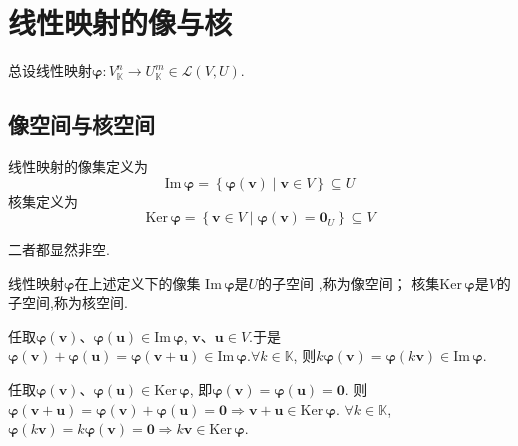 \section{线性映射的像与核}
\begin{red}
\begin{remark}
    总设线性映射$\bm{\varphi}:V_{\mathbb{K}}^n\longrightarrow U_{\mathbb{K}}^m \in 
\mathcal{L}\left(V,U\right)$.
\end{remark}
\end{red}
\subsection{像空间与核空间}
\begin{formal}
\begin{definition}[像集与核集]\label{def:像集与核集}
    线性映射的像集定义为
    \[
    \mathrm{Im}\, \bm{\varphi}=\left\{
        \bm{\varphi}\left(\bm{v}\right)\mid
        \bm{v} \in V
    \right\}\subseteq U
    \]
    核集定义为
    \[
    \mathrm{Ker}\,\bm{\varphi}=
    \left\{\bm{v}\in V \mid \bm{\varphi}\left(\bm{v}\right)=\bm{0}_{U}\right\}\subseteq V
    \]

    二者都显然非空.
\end{definition}
\end{formal}
\begin{green}
\begin{lemma}[像集与核集的子空间性]\label{lemma:像集与核集的子空间性}
    线性映射$\bm{\varphi}$在上述定义下的像集
    $\mathrm{Im}\,\bm{\varphi}$是$U$的子空间
    ,称为像空间；
    核集$\mathrm{Ker}\,\bm{\varphi}$是$V$的子空间,称为核空间.
\end{lemma}
\begin{Proof}
任取$\bm{\varphi}\left(\bm{v}\right)$、$\bm{\varphi}\left(\bm{u}\right)\in \mathrm{Im}\,\bm{\varphi}$,
$\bm{v}$、$\bm{u}\in V.$于是
$\bm{\varphi}\left(\bm{v}\right)+\bm{\varphi}\left(\bm{u}\right)=\bm{\varphi}\left(
    \bm{v}+\bm{u}
\right)\in \mathrm{Im}\,\bm{\varphi}$.$\forall k\in \mathbb{K}$,
则$k\bm{\varphi}\left(\bm{v}\right)=\bm{\varphi}\left(k\bm{v}\right)\in\mathrm{Im}\,\bm{\varphi}.
$

任取$\bm{\varphi}\left(\bm{v}\right)$、$\bm{\varphi}\left(\bm{u}\right)\in \mathrm{Ker}\,\bm{\varphi}$,
即$\bm{\varphi}\left(\bm{v}\right)=\bm{\varphi}\left(\bm{u}\right)=\bm{0}$.
则$\bm{\varphi}\left(
    \bm{v}+\bm{u}
\right)=\bm{\varphi}\left(\bm{v}\right)+\bm{\varphi}\left(
    \bm{u}
\right)=\bm{0}\Longrightarrow
\bm{v}+\bm{u}\in \mathrm{Ker}\,\bm{\varphi}.$
$\forall k\in\mathbb{K}$,$\bm{\varphi}\left(
    k\bm{v}
\right)=k\bm{\varphi}\left(
    \bm{v}
\right)=\bm{0}\Longrightarrow
k\bm{v}\in \mathrm{Ker}\,\bm{\varphi}.
$
\end{Proof}
\end{green}
